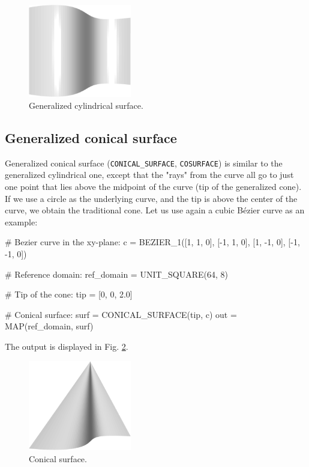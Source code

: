 \begin{figure}[!ht]
\begin{center}
\includegraphics[width=0.4\textwidth]{img/curves-11.png}
\end{center}
\vspace{-4mm}
\caption{Generalized cylindrical surface.}
\label{fig:curves-11}
\end{figure}


\subsection{Generalized conical surface}

Generalized conical surface ({\tt CONICAL\_SURFACE}, {\tt COSURFACE}) 
is similar to the generalized cylindrical 
one, except that the "rays" from the curve all go to just one
point that lies above the midpoint of the curve (tip of the generalized cone). 
If we use a circle as the underlying curve, and the tip is above the center of the curve, 
we obtain the traditional cone. Let us use again a cubic B\'ezier curve
as an example:

\begin{bluecode}
# Bezier curve in the xy-plane:
c = BEZIER_1([1, 1, 0], [-1, 1, 0], [1, -1, 0], [-1, -1, 0])

# Reference domain:
ref_domain = UNIT_SQUARE(64, 8)

# Tip of the cone:
tip = [0, 0, 2.0]

# Conical surface:
surf = CONICAL_SURFACE(tip, c)
out = MAP(ref_domain, surf)
\end{bluecode}
The output is displayed in Fig. \ref{fig:curves-12}.

\begin{figure}[!ht]
\begin{center}
\includegraphics[width=0.4\textwidth]{img/curves-12.png}
\end{center}
\vspace{-4mm}
\caption{Conical surface.}
\label{fig:curves-12}
\end{figure}



